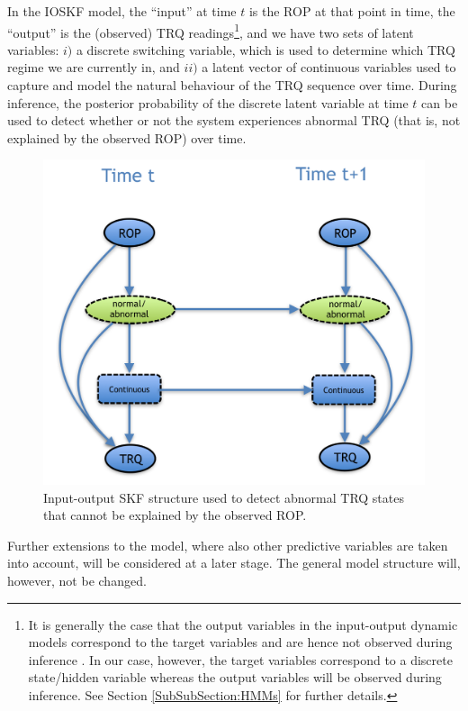 In the IOSKF model, the ``input'' at time $t$ is the ROP at that point in time, the ``output'' is the (observed) TRQ readings\footnote{It is generally the case that the output variables in the input-output dynamic models correspond to the target variables and are hence not observed during inference \cite{barberBRML2012}. In our case, however, the target variables correspond to a discrete state/hidden variable whereas the output variables will be observed during inference. See Section \ref{SubSubSection:HMMs} for further details.}, and we have two sets of latent variables: $i)$ a discrete switching variable, which is used to determine which TRQ regime we are currently in, and $ii)$ a latent vector of continuous variables used to capture and model the natural behaviour of the TRQ sequence over time. During inference, the posterior probability of the discrete latent variable at time $t$ can be used to detect whether or not the system experiences abnormal TRQ (that is, not explained by the observed ROP) over time. 

\begin{figure}[ht!]
\begin{center}
\includegraphics[scale=0.5]{./figures/VT_Scenario1} 
\caption{\label{Figure:VTScenario1} Input-output SKF structure used to detect abnormal TRQ states that cannot be explained by the observed ROP.}
\end{center}
\end{figure}

Further extensions to the model, where also other predictive variables are taken into account, will be considered at a later stage. The general model structure will, however, not be changed.

